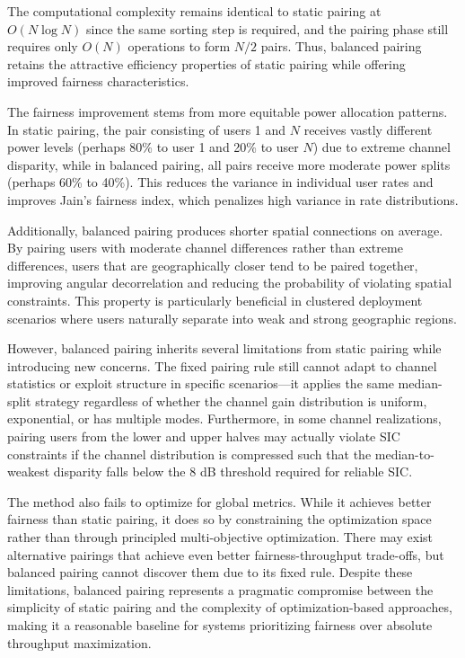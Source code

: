 The computational complexity remains identical to static pairing at $O(N \log N)$ since the same sorting step is required, and the pairing phase still requires only $O(N)$ operations to form $N/2$ pairs. Thus, balanced pairing retains the attractive efficiency properties of static pairing while offering improved fairness characteristics.

The fairness improvement stems from more equitable power allocation patterns. In static pairing, the pair consisting of users 1 and $N$ receives vastly different power levels (perhaps 80\% to user 1 and 20\% to user $N$) due to extreme channel disparity, while in balanced pairing, all pairs receive more moderate power splits (perhaps 60\% to 40\%). This reduces the variance in individual user rates and improves Jain's fairness index, which penalizes high variance in rate distributions.

Additionally, balanced pairing produces shorter spatial connections on average. By pairing users with moderate channel differences rather than extreme differences, users that are geographically closer tend to be paired together, improving angular decorrelation and reducing the probability of violating spatial constraints. This property is particularly beneficial in clustered deployment scenarios where users naturally separate into weak and strong geographic regions.

However, balanced pairing inherits several limitations from static pairing while introducing new concerns. The fixed pairing rule still cannot adapt to channel statistics or exploit structure in specific scenarios—it applies the same median-split strategy regardless of whether the channel gain distribution is uniform, exponential, or has multiple modes. Furthermore, in some channel realizations, pairing users from the lower and upper halves may actually violate SIC constraints if the channel distribution is compressed such that the median-to-weakest disparity falls below the 8 dB threshold required for reliable SIC.

The method also fails to optimize for global metrics. While it achieves better fairness than static pairing, it does so by constraining the optimization space rather than through principled multi-objective optimization. There may exist alternative pairings that achieve even better fairness-throughput trade-offs, but balanced pairing cannot discover them due to its fixed rule. Despite these limitations, balanced pairing represents a pragmatic compromise between the simplicity of static pairing and the complexity of optimization-based approaches, making it a reasonable baseline for systems prioritizing fairness over absolute throughput maximization.

